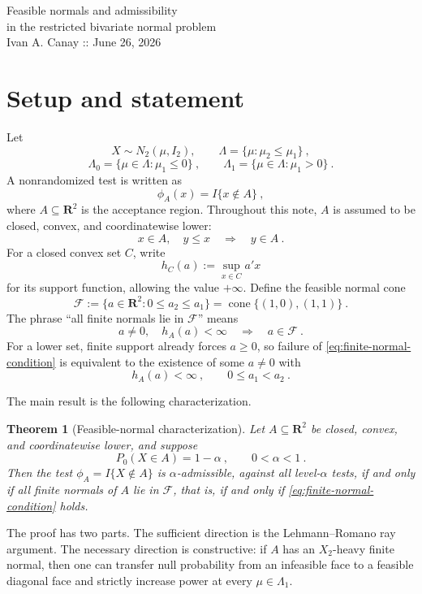 \documentclass[12pt]{article}
\newtheorem{theorem}{Theorem}
\theoremstyle{remark}
\begin{document}
\begin{center}
{\Large Feasible normals and admissibility\\ in the restricted bivariate normal problem}\\[3pt]
{\small Ivan A. Canay :: June 26, 2026} 
\end{center}



\medskip

\section*{Setup and statement}

Let
\[
X\sim N_2(\mu,I_2),
\qquad
\Lambda=\{\mu:\mu_2\le \mu_1\}~,
\]
\[
\Lambda_0=\{\mu\in\Lambda:\mu_1\le0\}~,
\qquad
\Lambda_1=\{\mu\in\Lambda:\mu_1>0\}~.
\]
A nonrandomized test is written as
\[
\phi_A(x)=I\{x\notin A\}~,
\]
where $A\subseteq\mathbf R^2$ is the acceptance region.  Throughout this note,
$A$ is assumed to be closed, convex, and coordinatewise lower:
\[
x\in A,
\quad y\le x
\quad\Longrightarrow\quad
 y\in A~.
\]
For a closed convex set $C$, write
\[
h_C(a):=\sup_{x\in C}a'x
\]
for its support function, allowing the value $+\infty$.  Define the feasible normal cone
\[
\mathcal F:=\{a\in\mathbf R^2:0\le a_2\le a_1\}
=\operatorname{cone}\{(1,0),(1,1)\}~.
\]
The phrase ``all finite normals lie in $\mathcal F$'' means
\begin{equation}\label{eq:finite-normal-condition}
    a\ne0,
    \quad h_A(a)<\infty
    \quad\Longrightarrow\quad
    a\in\mathcal F~.
\end{equation}
For a lower set, finite support already forces $a\ge0$, so failure of
\eqref{eq:finite-normal-condition} is equivalent to the existence of some
$a\ne0$ with
\[
h_A(a)<\infty~,
\qquad
0\le a_1<a_2~.
\]

The main result is the following characterization.

\begin{theorem}[Feasible-normal characterization]\label{thm:iff}
Let $A\subseteq\mathbf R^2$ be closed, convex, and coordinatewise lower, and suppose
\[
P_0(X\in A)=1-\alpha~,
\qquad 0<\alpha<1~.
\]
Then the test $\phi_A=I\{X\notin A\}$ is $\alpha$-admissible, against all level-$\alpha$ tests, if and only if all finite normals of $A$ lie in $\mathcal F$, that is, if and only if \eqref{eq:finite-normal-condition} holds.
\end{theorem}

The proof has two parts.  The sufficient direction is the Lehmann--Romano ray argument.  The necessary direction is constructive: if $A$ has an $X_2$-heavy finite normal, then one can transfer null probability from an infeasible face to a feasible diagonal face and strictly increase power at every $\mu\in\Lambda_1$.
\end{document}

